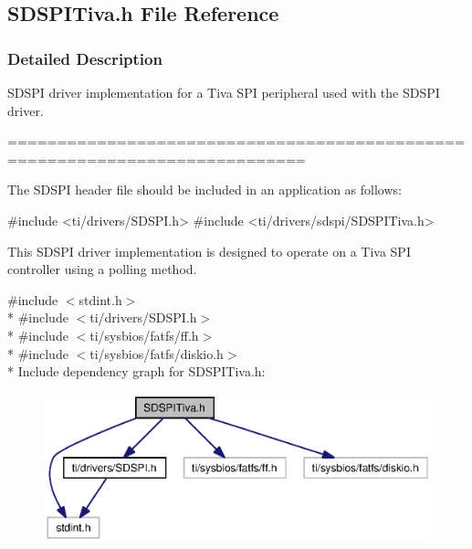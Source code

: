 \subsection{S\+D\+S\+P\+I\+Tiva.\+h File Reference}
\label{_s_d_s_p_i_tiva_8h}


\subsubsection{Detailed Description}
S\+D\+S\+P\+I driver implementation for a Tiva S\+P\+I peripheral used with the S\+D\+S\+P\+I driver. 

============================================================================

The S\+D\+S\+P\+I header file should be included in an application as follows\+: 
\begin{DoxyCode}
\textcolor{preprocessor}{#include <ti/drivers/SDSPI.h>}
\textcolor{preprocessor}{#include <ti/drivers/sdspi/SDSPITiva.h>}
\end{DoxyCode}


This S\+D\+S\+P\+I driver implementation is designed to operate on a Tiva S\+P\+I controller using a polling method. 

{\ttfamily \#include $<$stdint.\+h$>$}\\*
{\ttfamily \#include $<$ti/drivers/\+S\+D\+S\+P\+I.\+h$>$}\\*
{\ttfamily \#include $<$ti/sysbios/fatfs/ff.\+h$>$}\\*
{\ttfamily \#include $<$ti/sysbios/fatfs/diskio.\+h$>$}\\*
Include dependency graph for S\+D\+S\+P\+I\+Tiva.\+h\+:
\nopagebreak
\begin{figure}[H]
\begin{center}
\leavevmode
\includegraphics[width=350pt]{_s_d_s_p_i_tiva_8h__incl}
\end{center}
\end{figure}
